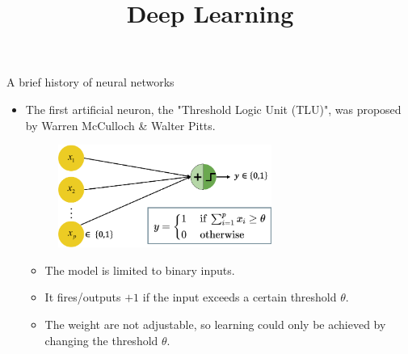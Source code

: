 




\newcommand{\titlefigure}{figure/rosenblatt_perceptron.jpg}
\newcommand{\learninggoals}{
  \item Predecessors of modern (deep) neural networks
  \item History of DL as a field
}

\title{Deep Learning}
\date{}




\begin{vbframe}{A brief history of neural networks}
\begin{itemize}
\item {} The first artificial neuron, the "Threshold Logic Unit (TLU)", was proposed by Warren McCulloch \& Walter Pitts.
\begin{figure}
\includegraphics[width=7cm]{figure/mp_neuron.png}
\end{figure}
\begin{itemize}
\item The model is limited to binary inputs.
\vspace{2mm}
\item %
It fires/outputs  $+1$ if the input exceeds a certain threshold $\theta$.
\vspace{2mm}
\item The weight are not adjustable, so learning could only be achieved by changing the threshold $\theta$.
\end{itemize}
\end{itemize}
\framebreak


\end{vbframe}
